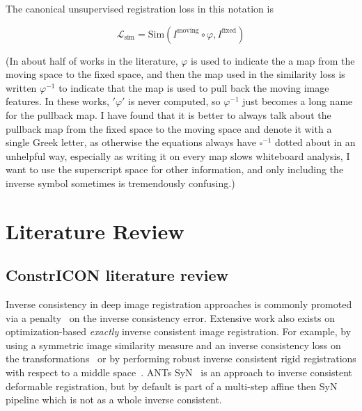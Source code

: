 \documentclass{article}
\begin{document}
The canonical unsupervised registration loss in this notation is

$$\mathcal{L}_\text{sim} = \text{Sim}(I^\text{moving} \circ  \varphi , I^\text{fixed}) $$

(In about half of works in the literature, $\varphi$ is used to indicate the a map from the moving space to the fixed space, and then the map used in the similarity loss is written $\varphi^{-1}$ to indicate that the map is used to pull back the moving image features. In these works, $'\varphi'$ is never computed, so $\varphi^{-1}$ just becomes a long name for the pullback map. I have found that it is better to always talk about the pullback map from the fixed space to the moving space and denote it with a single Greek letter, as otherwise the equations always have $\square^{-1}$ dotted about in an unhelpful way, especially as writing it on every map slows whiteboard analysis, I want to use the superscript space for other information, and only including the inverse symbol sometimes is tremendously confusing.)

\section{Literature Review}



\subsection{ConstrICON literature review}

Inverse consistency in deep image registration approaches is commonly promoted 
via a penalty~\cite{greer2021icon,shen2019networks,jun2018ICNet,Nazib2021Cnn}
on the inverse consistency error. Extensive work also exists on
optimization-based \emph{exactly} inverse consistent image registration. For example, by using a symmetric image similarity measure and an inverse consistency loss on the transformations~\cite{christensen2001consistent} or by performing robust inverse consistent rigid registrations with respect to a middle space~\cite{REUTER20101181}.
ANTs SyN~\cite{avants2008symmetric} is an
approach to inverse consistent deformable registration, but by default is part
of a multi-step affine then SyN pipeline which is not as a whole inverse
consistent. %
\end{document}
